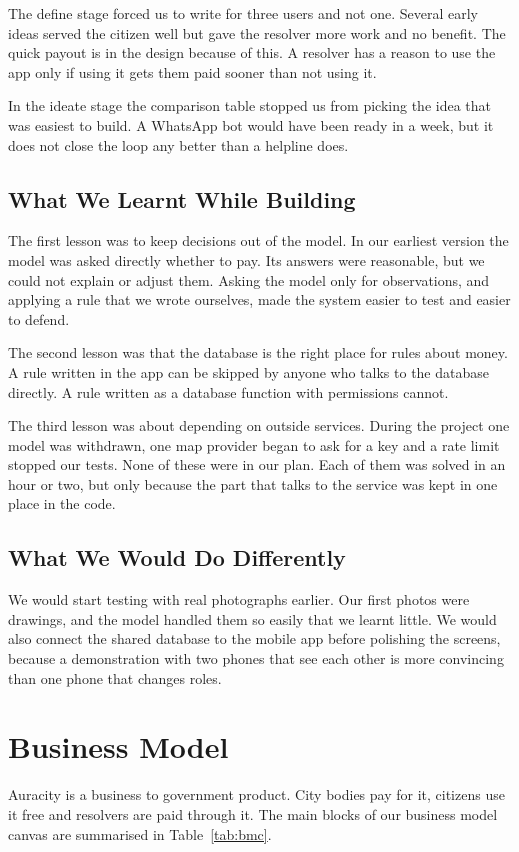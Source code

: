 \documentclass[conference,a4paper]{IEEEtran}
\begin{document}
The define stage forced us to write for three users and not one. Several early ideas served the citizen well but gave the resolver more work and no benefit. The quick payout is in the design because of this. A resolver has a reason to use the app only if using it gets them paid sooner than not using it.

In the ideate stage the comparison table stopped us from picking the idea that was easiest to build. A WhatsApp bot would have been ready in a week, but it does not close the loop any better than a helpline does.

\subsection{What We Learnt While Building}
The first lesson was to keep decisions out of the model. In our earliest version the model was asked directly whether to pay. Its answers were reasonable, but we could not explain or adjust them. Asking the model only for observations, and applying a rule that we wrote ourselves, made the system easier to test and easier to defend.

The second lesson was that the database is the right place for rules about money. A rule written in the app can be skipped by anyone who talks to the database directly. A rule written as a database function with permissions cannot.

The third lesson was about depending on outside services. During the project one model was withdrawn, one map provider began to ask for a key and a rate limit stopped our tests. None of these were in our plan. Each of them was solved in an hour or two, but only because the part that talks to the service was kept in one place in the code.

\subsection{What We Would Do Differently}
We would start testing with real photographs earlier. Our first photos were drawings, and the model handled them so easily that we learnt little. We would also connect the shared database to the mobile app before polishing the screens, because a demonstration with two phones that see each other is more convincing than one phone that changes roles.

\section{Business Model}\label{sec:biz}
Auracity is a business to government product. City bodies pay for it, citizens use it free and resolvers are paid through it. The main blocks of our business model canvas \cite{bmg} are summarised in Table~\ref{tab:bmc}.
\end{document}
